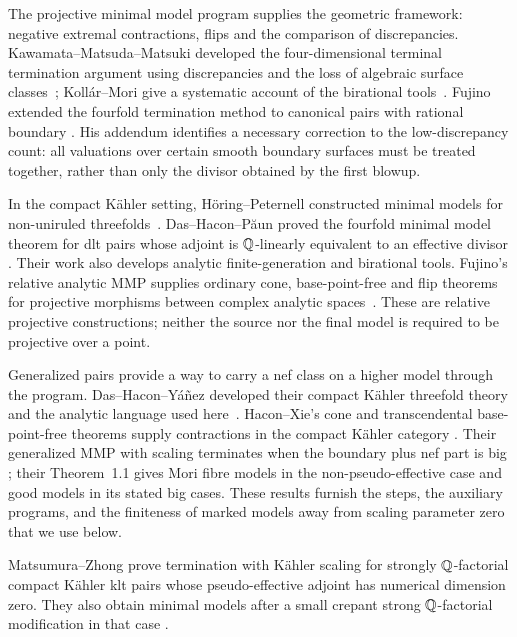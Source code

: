 The projective minimal model program supplies the geometric framework:
negative extremal contractions, flips and the comparison of discrepancies.
Kawamata--Matsuda--Matsuki developed the four-dimensional terminal
termination argument using discrepancies and the loss of algebraic
surface classes~\cite[Theorem~5-1-15 and
Lemmas~5-1-16--5-1-17]{KMM1987}; Kollár--Mori give a systematic account
of the birational tools~\cite{KM1998}. Fujino extended the
fourfold termination method to canonical pairs with rational boundary
\cite{Fujino2004,Fujino2005Addendum}. His addendum identifies a
necessary correction to the low-discrepancy count: all valuations over
certain smooth boundary surfaces must be treated together, rather than
only the divisor obtained by the first blowup.

In the compact Kähler setting, Höring--Peternell constructed minimal
models for non-uniruled threefolds~\cite{HP2016}.
Das--Hacon--Păun proved the fourfold minimal model theorem for dlt
pairs whose adjoint is $\mathbb Q$-linearly equivalent to an effective divisor
\cite[Theorem~1.1]{DHP2024}. Their work also develops analytic
finite-generation and birational tools. Fujino's relative analytic
MMP supplies ordinary cone, base-point-free and flip theorems for
projective morphisms between complex analytic spaces~\cite{Fujino2022}.
These are relative projective constructions; neither the source nor
the final model is required to be projective over a point.

Generalized pairs provide a way to carry a nef class on a higher model
through the program. Das--Hacon--Yáñez developed their compact Kähler
threefold theory and the analytic language used here~\cite{DHY2023}.
Hacon--Xie's cone and transcendental base-point-free theorems supply
contractions in the compact Kähler category
\cite[Theorems~1.3--1.4]{HX2026}. Their generalized MMP with scaling
terminates when the boundary plus nef part is big
\cite[Theorem~1.5]{HX2026}; their Theorem~1.1 gives Mori fibre
models in the non-pseudo-effective case and good models in its stated
big cases. These results furnish the steps, the auxiliary programs,
and the finiteness of marked models away from scaling parameter zero
that we use below.

Matsumura--Zhong prove termination with Kähler scaling for strongly
$\mathbb Q$-factorial compact Kähler klt pairs whose pseudo-effective adjoint
has numerical dimension zero. They also obtain minimal models after
a small crepant strong $\mathbb Q$-factorial modification in that case
\cite[Theorems~6.1 and~6.3]{MatsumuraZhong2026}.


